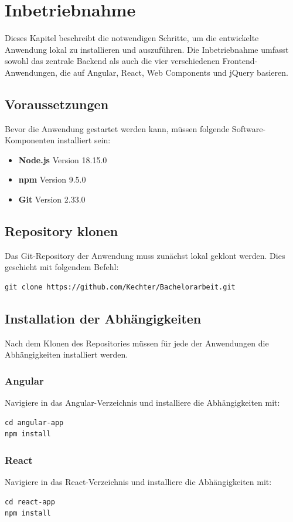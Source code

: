 \documentclass[oneside]{ausarbeitung}
\begin{document}
\chapter{Inbetriebnahme}
Dieses Kapitel beschreibt die notwendigen Schritte, um die entwickelte Anwendung lokal zu installieren und auszuführen. Die Inbetriebnahme umfasst sowohl das zentrale Backend als auch die vier verschiedenen Frontend-Anwendungen, die auf Angular, React, Web Components und jQuery basieren.

\section{Voraussetzungen}
Bevor die Anwendung gestartet werden kann, müssen folgende Software-Komponenten installiert sein:
\begin{itemize}
    \item \textbf{Node.js} Version 18.15.0
    \item \textbf{npm} Version 9.5.0 
    \item \textbf{Git} Version 2.33.0
\end{itemize}

\section{Repository klonen}
Das Git-Repository der Anwendung muss zunächst lokal geklont werden. Dies geschieht mit folgendem Befehl:
\begin{verbatim}
git clone https://github.com/Kechter/Bachelorarbeit.git
\end{verbatim}

\section{Installation der Abhängigkeiten}
Nach dem Klonen des Repositories müssen für jede der Anwendungen die Abhängigkeiten installiert werden. 

\subsection{Angular}
Navigiere in das Angular-Verzeichnis und installiere die Abhängigkeiten mit:
\begin{verbatim}
cd angular-app
npm install
\end{verbatim}

\subsection{React}
Navigiere in das React-Verzeichnis und installiere die Abhängigkeiten mit:
\begin{verbatim}
cd react-app
npm install
\end{verbatim}
\end{document}
